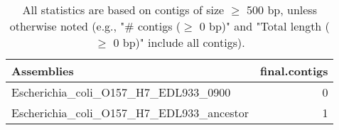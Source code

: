 \documentclass[12pt,a4paper]{article}
\begin{document}
\begin{table}[ht]
\begin{center}
\caption{All statistics are based on contigs of size $\geq$ 500 bp, unless otherwise noted (e.g., "\# contigs ($\geq$ 0 bp)" and "Total length ($\geq$ 0 bp)" include all contigs).}
\begin{tabular}{|l*{1}{|r}|}
\hline
Assemblies & final.contigs \\ \hline
Escherichia\_coli\_O157\_H7\_EDL933\_0900 & 0 \\ \hline
Escherichia\_coli\_O157\_H7\_EDL933\_ancestor & 1 \\ \hline
\end{tabular}
\end{center}
\end{table}
\end{document}
